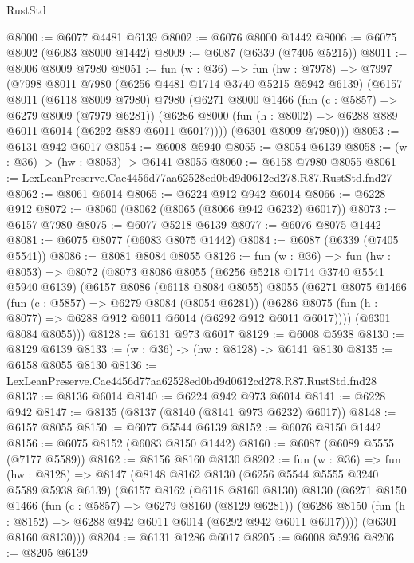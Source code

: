 \begin{lexlean}{RustStd}
\begin{coremodule}
{{@8000 := @6077 @4481 @6139
@8002 := @6076 @8000 @1442
@8006 := @6075 @8002 (@6083 @8000 @1442)
@8009 := @6087 (@6339 (@7405 @5215))
@8011 := @8006 @8009 @7980
@8051 := fun (w : @36) =>
  fun (hw : @7978) =>
  @7997
    (@7998
      @8011
      @7980
      (@6256 @4481 @1714 @3740 @5215 @5942 @6139)
      (@6157
        @8011
        (@6118 @8009 @7980)
        @7980
        (@6271
          @8000
          @1466
          (fun (c : @5857) => @6279 @8009 (@7979 @6281))
          (@6286 @8000 (fun (h : @8002) => @6288 @889 @6011 @6014 (@6292 @889 @6011 @6017))))
        (@6301 @8009 @7980)))
@8053 := @6131 @942 @6017
@8054 := @6008 @5940
@8055 := @8054 @6139
@8058 := (w : @36) -> (hw : @8053) -> @6141 @8055
@8060 := @6158 @7980 @8055
@8061 := LexLeanPreserve.Cae4456d77aa62528ed0bd9d0612cd278.R87.RustStd.fnd27
@8062 := @8061 @6014
@8065 := @6224 @912 @942 @6014
@8066 := @6228 @912
@8072 := @8060 (@8062 (@8065 (@8066 @942 @6232) @6017))
@8073 := @6157 @7980
@8075 := @6077 @5218 @6139
@8077 := @6076 @8075 @1442
@8081 := @6075 @8077 (@6083 @8075 @1442)
@8084 := @6087 (@6339 (@7405 @5541))
@8086 := @8081 @8084 @8055
@8126 := fun (w : @36) =>
  fun (hw : @8053) =>
  @8072
    (@8073
      @8086
      @8055
      (@6256 @5218 @1714 @3740 @5541 @5940 @6139)
      (@6157
        @8086
        (@6118 @8084 @8055)
        @8055
        (@6271
          @8075
          @1466
          (fun (c : @5857) => @6279 @8084 (@8054 @6281))
          (@6286 @8075 (fun (h : @8077) => @6288 @912 @6011 @6014 (@6292 @912 @6011 @6017))))
        (@6301 @8084 @8055)))
@8128 := @6131 @973 @6017
@8129 := @6008 @5938
@8130 := @8129 @6139
@8133 := (w : @36) -> (hw : @8128) -> @6141 @8130
@8135 := @6158 @8055 @8130
@8136 := LexLeanPreserve.Cae4456d77aa62528ed0bd9d0612cd278.R87.RustStd.fnd28
@8137 := @8136 @6014
@8140 := @6224 @942 @973 @6014
@8141 := @6228 @942
@8147 := @8135 (@8137 (@8140 (@8141 @973 @6232) @6017))
@8148 := @6157 @8055
@8150 := @6077 @5544 @6139
@8152 := @6076 @8150 @1442
@8156 := @6075 @8152 (@6083 @8150 @1442)
@8160 := @6087 (@6089 @5555 (@7177 @5589))
@8162 := @8156 @8160 @8130
@8202 := fun (w : @36) =>
  fun (hw : @8128) =>
  @8147
    (@8148
      @8162
      @8130
      (@6256 @5544 @5555 @3240 @5589 @5938 @6139)
      (@6157
        @8162
        (@6118 @8160 @8130)
        @8130
        (@6271
          @8150
          @1466
          (fun (c : @5857) => @6279 @8160 (@8129 @6281))
          (@6286 @8150 (fun (h : @8152) => @6288 @942 @6011 @6014 (@6292 @942 @6011 @6017))))
        (@6301 @8160 @8130)))
@8204 := @6131 @1286 @6017
@8205 := @6008 @5936
@8206 := @8205 @6139
}}
\end{coremodule}
\end{lexlean}
